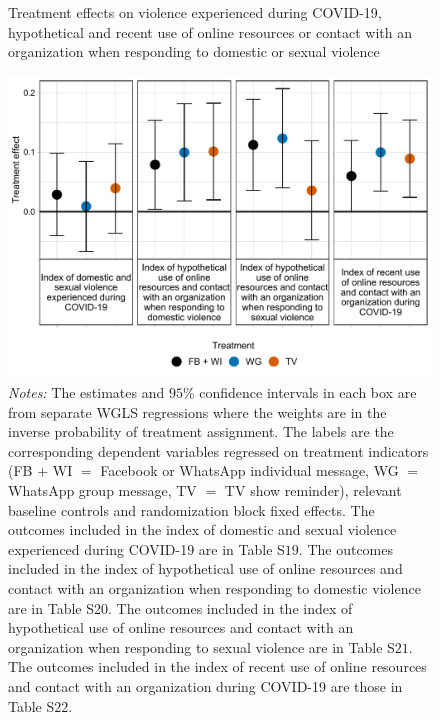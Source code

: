 \documentclass[12pt]{article}
\begin{document}
\begin{figure}[H]
    \centering
    \caption{Treatment effects on violence experienced during COVID-19, hypothetical and recent use of online resources or contact with an organization when responding to domestic or sexual violence}
    \includegraphics[width=12cm, height=9cm\textwidth]{Figures/RF-FS/Figure4.pdf}
    \captionsetup{width=.75\linewidth}
    \caption*{\footnotesize \textit{Notes:} The estimates and $95$\% confidence intervals in each box are from separate WGLS regressions where the weights are in the inverse probability of treatment assignment. The labels are the corresponding dependent variables regressed on treatment indicators (FB $+$ WI $=$ Facebook or WhatsApp individual message, WG $=$ WhatsApp group message, TV $=$ TV show reminder), relevant baseline controls and randomization block fixed effects. The outcomes included in the index of domestic and sexual violence experienced during COVID-19 are in Table S$19$. The outcomes included in the index of hypothetical use of online resources and contact with an organization when responding to domestic violence are in Table S20. The outcomes included in the index of hypothetical use of online resources and contact with an organization when responding to sexual violence are in Table S$21$. The outcomes included in the index of recent use of online resources and contact with an organization during COVID-19 are those in Table S$22$.}
\end{figure}
\end{document}

